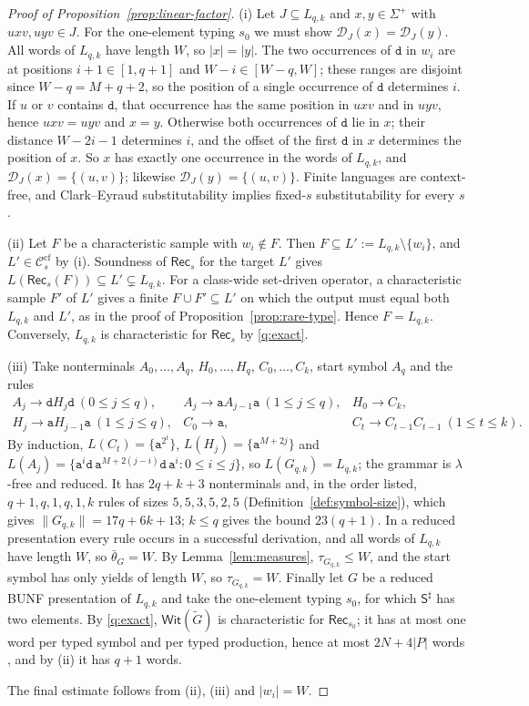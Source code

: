 \documentclass[11pt]{article}
\numberwithin{equation}{section}
\theoremstyle{plain}
\theoremstyle{definition}
\theoremstyle{remark}
\theoremstyle{plain}
\newcommand{\cf}{\mathrm{cf}}
\newcommand{\Ccf}[1]{\mathcal C_{#1}^{\cf}}
\newcommand{\Rec}{\mathsf{Rec}}
\newcommand{\WitnessSet}{\mathsf{Wit}}
\newcommand{\D}{\mathcal{D}}
\begin{document}
\begin{proof}[Proof of Proposition~\ref{prop:linear-factor}]
(i) Let $J\subseteq L_{q,k}$ and $x,y\in\Sigma^+$ with $uxv,uyv\in J$.  For
the one-element typing $s_0$ we must show $\D_J(x)=\D_J(y)$.  All
words of $L_{q,k}$ have length $W$, so $|x|=|y|$.  The two occurrences of
$\mathtt d$ in $w_i$ are at positions $i+1\in[1,q+1]$ and
$W-i\in[W-q,W]$; these ranges are disjoint since $W-q=M+q+2$, so the
position of a single occurrence of $\mathtt d$ determines $i$.  If $u$ or $v$
contains $\mathtt d$, that occurrence has the same position in $uxv$ and in
$uyv$, hence $uxv=uyv$ and $x=y$.  Otherwise both occurrences of
$\mathtt d$ lie in $x$; their distance $W-2i-1$ determines $i$, and the
offset of the first $\mathtt d$ in $x$ determines the position of $x$.  So
$x$ has exactly one occurrence in the words of $L_{q,k}$, and
$\D_J(x)=\{(u,v)\}$; likewise $\D_J(y)=\{(u,v)\}$.  Finite
languages are context-free, and Clark--Eyraud substitutability implies
fixed-$s$ substitutability for every $s$.

(ii) Let $F$ be a characteristic sample with $w_i\notin F$.  Then
$F\subseteq L':=L_{q,k}\setminus\{w_i\}$, and $L'\in\Ccf{s}$ by (i).
Soundness of $\Rec_s$ \cite[Theorem~4.2]{kuriyamaCFG} for the target $L'$ gives
$L(\Rec_s(F))\subseteq L'\subsetneq L_{q,k}$.  For a class-wide set-driven
operator, a characteristic sample $F'$ of $L'$ gives a finite
$F\cup F'\subseteq L'$ on which the output must equal both $L_{q,k}$ and $L'$,
as in the proof of Proposition~\ref{prop:rare-type}.  Hence $F=L_{q,k}$.
Conversely, $L_{q,k}$ is characteristic for $\Rec_s$ by \ref{q:exact}.

(iii) Take nonterminals $A_0,\ldots,A_q$, $H_0,\ldots,H_q$, $C_0,\ldots,C_k$,
start symbol $A_q$ and the rules
\[
\begin{array}{lll}
 A_j\to\mathtt d H_j\mathtt d\ (0\le j\le q), &
 A_j\to\mathtt a A_{j-1}\mathtt a\ (1\le j\le q), &
 H_0\to C_k,\\
 H_j\to\mathtt a H_{j-1}\mathtt a\ (1\le j\le q), &
 C_0\to\mathtt a, &
 C_t\to C_{t-1}C_{t-1}\ (1\le t\le k).
\end{array}
\]
By induction, $L(C_t)=\{\mathtt a^{2^t}\}$,
$L(H_j)=\{\mathtt a^{M+2j}\}$ and
$L(A_j)=\{\mathtt a^i\mathtt d\,\mathtt a^{M+2(j-i)}\mathtt d\,\mathtt a^i:0\le i\le j\}$, so $L(G_{q,k})=L_{q,k}$; the grammar is
$\lambda$-free and reduced.  It has $2q+k+3$ nonterminals and, in the order listed,
$q+1,q,1,q,1,k$ rules of sizes $5,5,3,5,2,5$
(Definition~\ref{def:symbol-size}), which gives $\|G_{q,k}\|=17q+6k+13$;
$k\le q$ gives the bound $23(q+1)$.  In a reduced presentation every rule
occurs in a successful derivation, and all words of $L_{q,k}$ have length
$W$, so $\bar\theta_G=W$.  By Lemma~\ref{lem:measures}, $\tau_{G_{q,k}}\le W$, and the start symbol has
only yields of length $W$, so $\tau_{G_{q,k}}=W$.
Finally let $G$ be a reduced BUNF presentation of $L_{q,k}$ and take the one-element
typing $s_0$, for which $\mathsf S^\sharp$ has two elements.  By
\ref{q:exact}, $\WitnessSet(\widetilde G)$ is characteristic for
$\Rec_{s_0}$; it has at most one word per typed symbol and per
typed production, hence at most $2N+4|P|$ words \cite[Lemma~6.2]{kuriyamaCFG},
and by (ii) it has $q+1$ words.

The final estimate follows from (ii), (iii) and $|w_i|=W$.
\end{proof}


\end{document}
